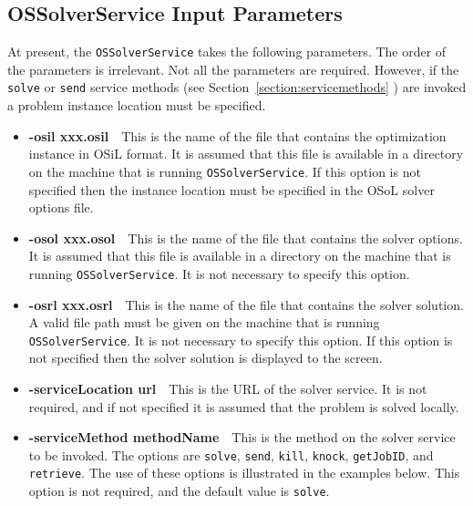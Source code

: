 \documentclass[11pt]{article}
\renewcommand{\_}{{\char"5F}}
\renewcommand{\{}{{\char"7B}}
\renewcommand{\}}{{\char"7D}}
\renewcommand{\^}{{\char"0D}}
\renewcommand{\'}{{\char"0D}}
\begin{document}
\begin{enumerate}[Step 1:]
\subsection{OSSolverService Input Parameters}

At present, the {\tt OSSolverService} takes the following parameters. The order of the parameters is irrelevant.  
Not all the parameters are required. However, if the {\tt solve} or {\tt send}%
 service    methods  (see Section~\ref{section:servicemethods} ) are invoked 
a problem instance location must be specified.

\begin{itemize}

\item[] {\bf -osil xxx.osil}\ \ This is the name of the file that contains the optimization instance in 
OSiL  format. It is assumed that this file is available in a directory on the 
machine that is running {\tt OSSolverService}. 
If this option is not specified then the instance location must be specified in the OSoL solver options file.

\item[] {\bf -osol xxx.osol}\ \ This is the name of the file that contains the solver options. It is assumed that 
this file is available in a directory on the machine that is running {\tt OSSolverService}. It is not necessary to 
specify this option.

\item[] {\bf -osrl xxx.osrl}\ \ This is the name of the file that contains the solver solution. A valid file path 
must be given on the machine that is running {\tt OSSolverService}. It is not necessary to specify this option. 
If this option is not specified then the solver solution is displayed to the screen.

\item[] {\bf -serviceLocation url}\ \ This is the URL of the solver service. It is not required, and if not specified it is assumed that the problem is solved locally.

\item[] {\bf -serviceMethod  methodName}\ \ This is  the method on the solver service to be invoked. 
The options are {\tt solve}, {\tt send}, 
{\tt kill}, {\tt knock}, 
{\tt getJobID}, and {\tt retrieve}. 
The use of these options is illustrated in the examples below. This option is not required, and the default 
value is {\tt solve}.


\end{itemize}
\end{enumerate}
\end{document}
